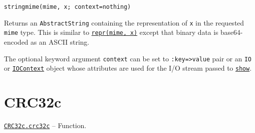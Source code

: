 \begin{adjustwidth}{2em}{0pt}


\begin{verbatim}
stringmime(mime, x; context=nothing)
\end{verbatim}

Returns an \texttt{AbstractString} containing the representation of \texttt{x} in the requested \texttt{mime} type. This is similar to \hyperlink{6454672882256768021}{\texttt{repr(mime, x)}} except that binary data is base64-encoded as an ASCII string.

The optional keyword argument \texttt{context} can be set to \texttt{:key=>value} pair or an \texttt{IO} or \hyperlink{13454403377667762339}{\texttt{IOContext}} object whose attributes are used for the I/O stream passed to \hyperlink{4561869563484222675}{\texttt{show}}.



\end{adjustwidth}

\hypertarget{2465264826987872946}{}


\chapter{CRC32c}


\hypertarget{8058568265327059376}{}
\hyperlink{8058568265327059376}{\texttt{CRC32c.crc32c}}  -- {Function.}

